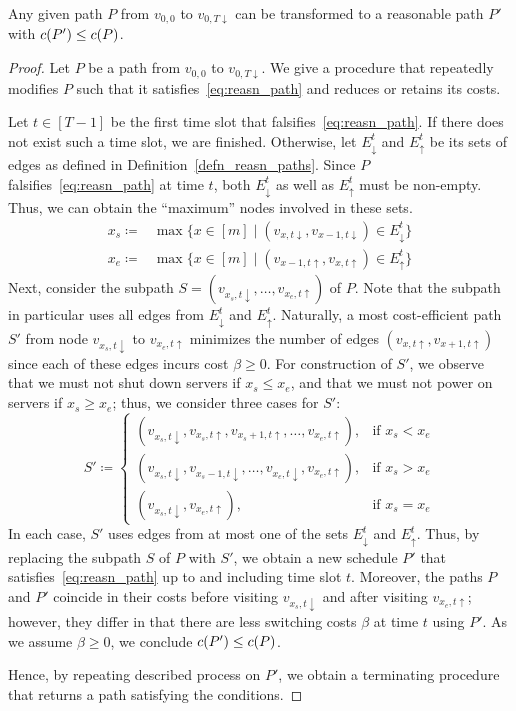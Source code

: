 \begin{prop}\label{prop:path_to_reasn_path}
Any given path $P$ from $v_{0,0}$ to $v_{0,T\downarrow}$ can be transformed to a reasonable path $P'$ with $c(P')\le c(P)$.
\end{prop}
\begin{proof}
Let $P$ be a path from $v_{0,0}$ to $v_{0,T\downarrow}$. We give a procedure that repeatedly modifies $P$ such that it satisfies~\eqref{eq:reasn_path} and reduces or retains its costs. 

Let $t\in[T-1]$ be the first time slot that falsifies~\eqref{eq:reasn_path}. If there does not exist such a time slot, we are finished. Otherwise, let $E_\downarrow^t$ and $E_\uparrow^t$ be its sets of edges as defined in Definition~\ref{defn_reasn_paths}. Since $P$ falsifies~\eqref{eq:reasn_path} at time $t$, both $E_\downarrow^t$ as well as $E_\uparrow^t$ must be non-empty. Thus, we can obtain the ``maximum'' nodes involved in these sets.
\begin{align*}
	x_s\coloneqq&\max\bigl\{x\in[m]\mid (v_{x,t\downarrow},v_{x-1,t\downarrow})\in E_\downarrow^t\bigr\}\\
	x_e\coloneqq&\max\bigl\{x\in[m]\mid (v_{x-1,t\uparrow},v_{x,t\uparrow})\in E_\uparrow^t\bigr\}
\end{align*}
Next, consider the subpath $S=(v_{x_s,t\downarrow},\ldots,v_{x_e,t\uparrow})$ of $P$. Note that the subpath in particular uses all edges from $E_\downarrow^t$ and $E_\uparrow^t$.
Naturally, a most cost-efficient path $S'$ from node $v_{x_s,t\downarrow}$ to $v_{x_e,t\uparrow}$ minimizes the number of edges $(v_{x,t\uparrow},v_{x+1,t\uparrow})$ since each of these edges incurs cost $\beta\ge 0$. For construction of $S'$, we observe that we must not shut down servers if $x_s\le x_e$, and that we must not power on servers if $x_s\ge x_e$; thus, we consider three cases for $S'$:
\begin{equation*}
	S'\coloneqq
	\begin{cases}
		(v_{x_s,t\downarrow},v_{x_s,t\uparrow},v_{x_s+1,t\uparrow},\ldots,v_{x_e,t\uparrow}), & \text{if $x_s< x_e$}\\
		(v_{x_s,t\downarrow},v_{x_s-1,t\downarrow},\ldots,v_{x_e,t\downarrow},v_{x_e,t\uparrow}), & \text{if $x_s>x_e$}\\
		(v_{x_s,t\downarrow},v_{x_e,t\uparrow}), & \text{if $x_s=x_e$}
	\end{cases}
\end{equation*}
In each case, $S'$ uses edges from at most one of the sets $E_\downarrow^t$ and $E_\uparrow^t$. Thus, by replacing the subpath $S$ of $P$ with $S'$, we obtain a new schedule $P'$ that satisfies~\eqref{eq:reasn_path} up to and including time slot $t$. Moreover, the paths $P$ and $P'$ coincide in their costs before visiting $v_{x_s,t\downarrow}$ and after visiting $v_{x_e,t\uparrow}$; however, they differ in that there are less switching costs $\beta$ at time $t$ using $P'$. As we assume $\beta\ge0$, we conclude $c(P')\le c(P)$.

Hence, by repeating described process on $P'$, we obtain a terminating procedure that returns a path satisfying the conditions.
\end{proof}

